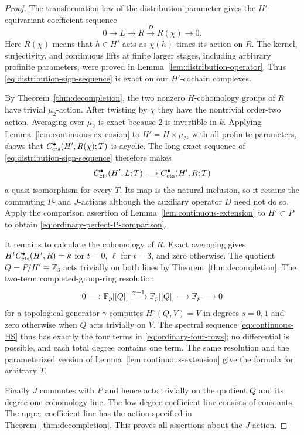 \begin{proof}
The transformation law of the distribution parameter
gives the $H'$-equivariant coefficient sequence
\begin{equation}
 \label{eq:distribution-sign-sequence}
 0\longrightarrow L\longrightarrow R
 \xrightarrow{D}R(\chi)\longrightarrow0.
\end{equation}
Here $R(\chi)$ means that $h\in H'$ acts as
$\chi(h)$ times its action on $R$.  The kernel,
surjectivity, and continuous lifts at finite larger
stages, including arbitrary profinite parameters, were
proved in Lemma~\ref{lem:distribution-operator}.
Thus \eqref{eq:distribution-sign-sequence} is exact on
our $H'$-cochain complexes.

By Theorem~\ref{thm:decompletion}, the two nonzero
$H$-cohomology groups of $R$ have trivial $\mu_2$-action.
After twisting by $\chi$ they have the nontrivial
order-two action.  Averaging over $\mu_2$ is exact
because $2$ is invertible in $k$.  Applying
Lemma~\ref{lem:continuous-extension} to
$H'=H\times\mu_2$, with all profinite parameters, shows
that $C^\bullet_{\mathrm{cts}}(H',R(\chi);T)$ is acyclic.
The long exact sequence of
\eqref{eq:distribution-sign-sequence} therefore makes
\[
 C^\bullet_{\mathrm{cts}}(H',L;T)\longrightarrow C^\bullet_{\mathrm{cts}}(H',R;T)
\]
a quasi-isomorphism for every $T$.
Its map is the natural inclusion, so it retains the
commuting $P$- and $J$-actions although the auxiliary
operator $D$ need not do so.
Apply the comparison assertion of
Lemma~\ref{lem:continuous-extension} to
$H'\subset P$ to obtain
\eqref{eq:ordinary-perfect-P-comparison}.

It remains to calculate the cohomology of $R$.
Exact averaging gives
$H^tC^\bullet_{\mathrm{cts}}(H',R)=k$ for $t=0$, $\ell$ for $t=3$,
and zero otherwise.  The quotient
$Q=P/H'\cong\mathbb Z_3$ acts trivially on both
lines by Theorem~\ref{thm:decompletion}.
The two-term completed-group-ring resolution
\[
 0\longrightarrow\mathbb F_p[[Q]]
 \xrightarrow{\gamma-1}\mathbb F_p[[Q]]
 \longrightarrow\mathbb F_p\longrightarrow0
\]
for a topological generator $\gamma$ computes
$H^s(Q,V)=V$ in degrees $s=0,1$ and zero otherwise
when $Q$ acts trivially on $V$.
The spectral sequence \eqref{eq:continuous-HS} thus
has exactly the four terms in
\eqref{eq:ordinary-four-rows}; no differential is
possible, and each total degree contains one term.
The same resolution and the parameterized version of
Lemma~\ref{lem:continuous-extension} give the formula
for arbitrary $T$.

Finally $J$ commutes with $P$ and hence acts trivially on
the quotient $Q$ and its degree-one cohomology line.
The low-degree coefficient line consists of constants.
The upper coefficient line has the action specified
in Theorem~\ref{thm:decompletion}.  This proves all
assertions about the $J$-action.
\end{proof}
